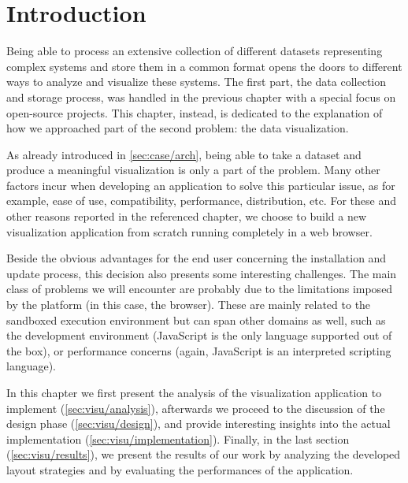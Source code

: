
\section{Introduction}

Being able to process an extensive collection of different datasets representing complex systems and store them in a common format opens the doors to different ways to analyze and visualize these systems. The first part, the data collection and storage process, was handled in the previous chapter with a special focus on open-source projects. This chapter, instead, is dedicated to the explanation of how we approached part of the second problem: the data visualization.

As already introduced in \vref{sec:case/arch}, being able to take a dataset and produce a meaningful visualization is only a part of the problem. Many other factors incur when developing an application to solve this particular issue, as for example, ease of use, compatibility, performance, distribution, etc. For these and other reasons reported in the referenced chapter, we choose to build a new visualization application from scratch running completely in a web browser.

Beside the obvious advantages for the end user concerning the installation and update process, this decision also presents some interesting challenges. The main class of problems we will encounter are probably due to the limitations imposed by the platform (in this case, the browser). These are mainly related to the sandboxed execution environment but can span other domains as well, such as the development environment (JavaScript is the only language supported out of the box), or performance concerns (again, JavaScript is an interpreted scripting language).

In this chapter we first present the analysis of the visualization application to implement (\ref{sec:visu/analysis}), afterwards we proceed to the discussion of the design phase (\ref{sec:visu/design}), and provide interesting insights into the actual implementation (\ref{sec:visu/implementation}). Finally, in the last section (\ref{sec:visu/results}), we present the results of our work by analyzing the developed layout strategies and by evaluating the performances of the application.

